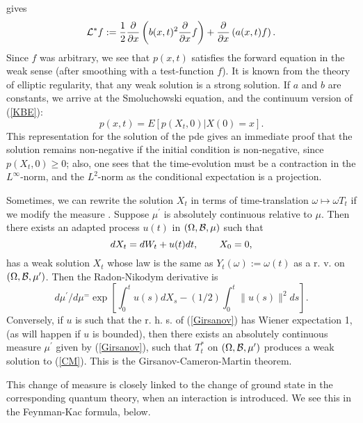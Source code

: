 gives
\[{\cal L}^*f:=\frac{1}{2}\frac{\partial}{\partial x}\left(b(x,t)^2\frac
{\partial}{\partial x}f\right)+\frac{\partial}{\partial x}\left(a(x,t)f
\right).\]
Since $f$ was arbitrary, we see that $p(x,t)$ satisfies the forward
equation in the weak sense (after smoothing with a test-function $f$).
It is known from the theory of elliptic regularity, that any weak
solution is a strong solution. If $a$ and $b$ are constants, we arrive at
the Smoluchowski equation, and the continuum version of (\ref{KBE}):
\[p(x,t)=E[p(X_t,0)|X(0)=x].\]
This representation for the solution of the pde gives an immediate proof
that the solution remains non-negative if the initial condition is
non-negative, since $p(X_t,0)\geq 0$; also, one sees that the time-evolution must be a contraction
in the $L^\infty$-norm, and the $L^2$-norm as the conditional expectation
is a projection.

Sometimes, we can rewrite the solution $X_t$ in terms of time-translation
$\omega\mapsto\omega T_t$ if we modify the measure \cite{Williams2}.
Suppose $\mu^\prime$
is absolutely continuous relative to $\mu$. Then there exists an adapted
process $u(t)$ in $(\Omega,{\cal B},\mu)$ such that
\begin{equation}
dX_t=dW_t+u(t)dt,\hspace{.3in}X_0=0,
\label{CM}
\end{equation}
has a weak solution $X_t$ whose law is the same as $Y_t(\omega):=\omega(t)$
as a r. v. on $(\Omega,{\cal B},\mu^\prime)$. Then the Radon-Nikodym
derivative is
\begin{equation}
d\mu^\prime/d\mu^=\exp\left[\int_0^tu(s)dX_s-(1/2)\int_0^t\|u(s)\|^2ds\right].
\label{Girsanov}
\end{equation}
Conversely, if $u$ is such that the r. h. s. of (\ref{Girsanov}) has Wiener
expectation 1, (as will happen if $u$ is bounded), then there exists
an absolutely continuous measure $\mu^\prime$ given by (\ref{Girsanov}),
such that $T^*_t$ on $(\Omega,{\cal B},\mu^\prime)$ produces a weak solution
to (\ref{CM}).
This is the Girsanov-Cameron-Martin theorem.

This change of measure is closely linked to the change of
ground state in the corresponding quantum theory, when an interaction is
introduced. We see this in the Feynman-Kac formula, below.

